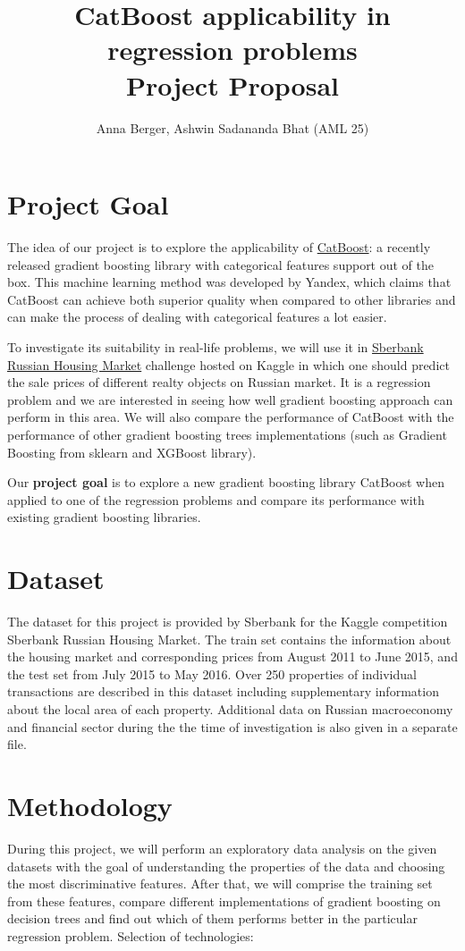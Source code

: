 \documentclass[11pt,a4paper]{article}
\title{\textbf{CatBoost applicability in regression problems} \\
	\Large{Project Proposal}}
\author{Anna Berger, Ashwin Sadananda Bhat (AML 25)}
\begin{document}
	\maketitle
	
	\section{Project Goal}
	The idea of our project is to explore the applicability of \href{https://github.com/catboost/catboost}{CatBoost}: a recently released gradient boosting library with categorical features support out of the box. This machine learning method was developed by Yandex, which claims that CatBoost can achieve both superior quality when compared to other libraries and can make the process of dealing with categorical features a lot easier.
	
	To investigate its suitability in real-life problems, we will use it in \href{https://www.kaggle.com/c/sberbank-russian-housing-market}{Sberbank Russian Housing Market} challenge hosted on Kaggle in which one should predict the sale prices of different realty objects on Russian market. It is a regression problem and we are interested in seeing how well gradient boosting approach can perform in this area. We will also compare the performance of CatBoost with the performance of other gradient boosting trees implementations (such as Gradient Boosting from sklearn and XGBoost library). 
	
	Our \textbf{project goal} is to explore a new gradient boosting library CatBoost when applied to one of the regression problems and compare its performance with existing gradient boosting libraries.
	
	\section{Dataset}
	The dataset for this project is provided by Sberbank for the Kaggle competition Sberbank Russian Housing Market. The train set contains the information about the housing market and corresponding prices from August 2011 to June 2015, and the test set from July 2015 to May 2016. Over 250 properties of individual transactions are described in this dataset including supplementary information about the local area of each property. Additional data on Russian macroeconomy and financial sector during the the time of investigation is also given in a separate file.
	
	
	\section{Methodology}
	During this project, we will perform an exploratory data analysis on the given datasets with the goal of understanding the properties of the data and choosing the most discriminative features. After that, we will comprise the training set from these features, compare different implementations of gradient boosting on decision trees and find out which of them performs better in the particular regression problem.
	Selection of technologies:
	
\end{document}

